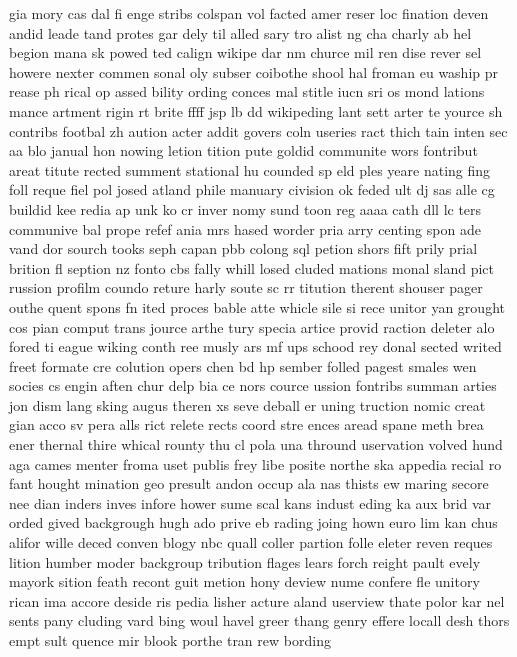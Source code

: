 \documentclass[twocolumn]{article}
\begin{document}
gia
mory
cas
dal
fi
enge
stribs
colspan
vol
facted
amer
reser
loc
fination
deven
andid
leade
tand
protes
gar
dely
til
alled
sary
tro
alist
ng
cha
charly
ab
hel
begion
mana
sk
powed
ted
calign
wikipe
dar
nm
churce
mil
ren
dise
rever
sel
howere
nexter
commen
sonal
oly
subser
coibothe
shool
hal
froman
eu
waship
pr
rease
ph
rical
op
assed
bility
ording
conces
mal
stitle
iucn
sri
os
mond
lations
mance
artment
rigin
rt
brite
ffff
jsp
lb
dd
wikipeding
lant
sett
arter
te
yource
sh
contribs
footbal
zh
aution
acter
addit
govers
coln
useries
ract
thich
tain
inten
sec
aa
blo
janual
hon
nowing
letion
tition
pute
goldid
communite
wors
fontribut
areat
titute
rected
summent
stational
hu
counded
sp
eld
ples
yeare
nating
fing
foll
reque
fiel
pol
josed
atland
phile
manuary
civision
ok
feded
ult
dj
sas
alle
cg
buildid
kee
redia
ap
unk
ko
cr
inver
nomy
sund
toon
reg
aaaa
cath
dll
lc
ters
communive
bal
prope
refef
ania
mrs
hased
worder
pria
arry
centing
spon
ade
vand
dor
sourch
tooks
seph
capan
pbb
colong
sql
petion
shors
fift
prily
prial
brition
fl
seption
nz
fonto
cbs
fally
whill
losed
cluded
mations
monal
sland
pict
russion
profilm
coundo
reture
harly
soute
sc
rr
titution
therent
shouser
pager
outhe
quent
spons
fn
ited
proces
bable
atte
whicle
sile
si
rece
unitor
yan
grought
cos
pian
comput
trans
jource
arthe
tury
specia
artice
provid
raction
deleter
alo
fored
ti
eague
wiking
conth
ree
musly
ars
mf
ups
schood
rey
donal
sected
writed
freet
formate
cre
colution
opers
chen
bd
hp
sember
folled
pagest
smales
wen
socies
cs
engin
aften
chur
delp
bia
ce
nors
cource
ussion
fontribs
summan
arties
jon
dism
lang
sking
augus
theren
xs
seve
deball
er
uning
truction
nomic
creat
gian
acco
sv
pera
alls
rict
relete
rects
coord
stre
ences
aread
spane
meth
brea
ener
thernal
thire
whical
rounty
thu
cl
pola
una
thround
uservation
volved
hund
aga
cames
menter
froma
uset
publis
frey
libe
posite
northe
ska
appedia
recial
ro
fant
hought
mination
geo
presult
andon
occup
ala
nas
thists
ew
maring
secore
nee
dian
inders
inves
infore
hower
sume
scal
kans
indust
eding
ka
aux
brid
var
orded
gived
backgrough
hugh
ado
prive
eb
rading
joing
hown
euro
lim
kan
chus
alifor
wille
deced
conven
blogy
nbc
quall
coller
partion
folle
eleter
reven
reques
lition
humber
moder
backgroup
tribution
flages
lears
forch
reight
pault
evely
mayork
sition
feath
recont
guit
metion
hony
deview
nume
confere
fle
unitory
rican
ima
accore
deside
ris
pedia
lisher
acture
aland
userview
thate
polor
kar
nel
sents
pany
cluding
vard
bing
woul
havel
greer
thang
genry
effere
locall
desh
thors
empt
sult
quence
mir
blook
porthe
tran
rew
bording
\end{document}
